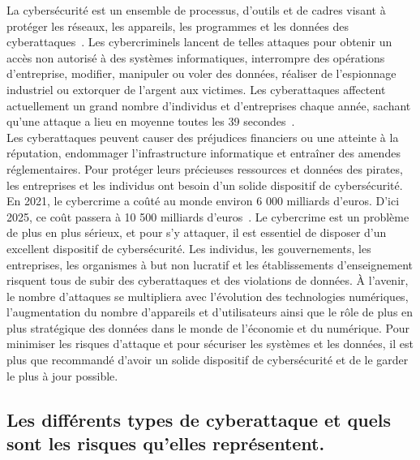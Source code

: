 \documentclass[a4paper,11pt]{article}
\begin{document}
La cybersécurité est un ensemble de processus, d'outils et de cadres visant à protéger les réseaux, les appareils, les programmes et les données des cyberattaques~\cite{article12}.
Les cybercriminels lancent de telles attaques pour obtenir un accès non autorisé à des systèmes informatiques, interrompre des opérations d'entreprise, modif{\null}ier, manipuler ou voler des données, réaliser de l'espionnage industriel ou extorquer de l'argent aux victimes. Les cyberattaques af{\null}fectent actuellement un grand nombre d'individus et d'entreprises chaque année, sachant qu'une attaque a lieu en moyenne toutes les 39 secondes~\cite{article1}.
\\Les cyberattaques peuvent causer des préjudices f{\null}inanciers ou une atteinte à la réputation, endommager l'infrastructure informatique et entraîner des amendes réglementaires.
Pour protéger leurs précieuses ressources et données des pirates, les entreprises et les individus ont besoin d'un solide dispositif de cybersécurité. En 2021, le cybercrime a coûté au monde environ 6 000 milliards d'euros. D'ici 2025, ce coût passera à 10 500 milliards d'euros~\cite{article1}.
Le cybercrime est un problème de plus en plus sérieux, et pour s'y attaquer, il est essentiel de disposer d'un excellent dispositif de cybersécurité. Les individus, les gouvernements, les entreprises, les organismes à but non lucratif et les établissements d'enseignement risquent tous de subir des cyberattaques et des violations de données.
À l'avenir, le nombre d'attaques se multipliera avec l'évolution des technologies numériques, l'augmentation du nombre d'appareils et d'utilisateurs ainsi que le rôle de plus en plus stratégique des données dans le monde de l'économie et du numérique.
Pour minimiser les risques d'attaque et pour sécuriser les systèmes et les données, il est plus que recommandé d'avoir un solide dispositif de cybersécurité et de le garder le plus à jour possible.


\subsection{Les différents types de cyberattaque et quels sont les risques qu'elles représentent.}
\end{document}
